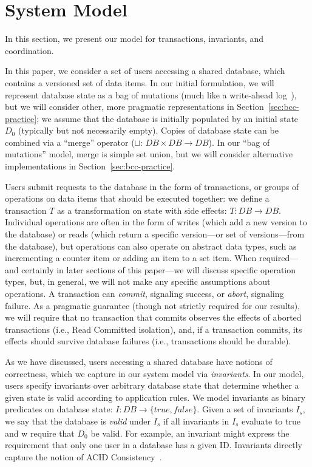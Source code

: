 
\section{System Model}
\label{sec:model}

In this section, we present our model for transactions, invariants,
and coordination.

 In this paper, we consider a set
of users accessing a shared database, which contains a versioned set
of data items. In our initial formulation, we will represent database
state as a bag of mutations (much like a write-ahead
log~\cite{gray-book}), but we will consider other, more pragmatic
representations in Section~\ref{sec:bcc-practice}; we assume that the
database is initially populated by an initial state $D_0$ (typically
but not necessarily empty). Copies of database state can be combined
via a ``merge'' operator ($\sqcup$: $DB \times DB \rightarrow DB$). In
our ``bag of mutations'' model, merge is simple set union, but we will
consider alternative implementations in
Section~\ref{sec:bcc-practice}.

Users submit requests to the database in the form of transactions, or
groups of operations on data items that should be executed together:
we define a transaction $T$ as a transformation on state with side
effects: $T: DB \rightarrow DB$. Individual operations are often in
the form of writes (which add a new version to the database) or reads
(which return a specific version---or set of versions---from the
database), but operations can also operate on abstract data types,
such as incrementing a counter item or adding an item to a set
item. When required---and certainly in later sections of this
paper---we will discuss specific operation types, but, in general, we
will not make any specific assumptions about operations. A transaction
can \textit{commit}, signaling success, or \textit{abort}, signaling
failure. As a pragmatic guarantee (though not strictly required for
our results), we will require that no transaction that commits
observes the effects of aborted transactions (i.e., Read Committed
isolation), and, if a transaction commits, its effects should survive
database failures (i.e., transactions should be durable).

 As we have discussed, users accessing a shared
database have notions of correctness, which we capture in our system
model via \textit{invariants}. In our model, users specify invariants
over arbitrary database state that determine whether a given state is
valid according to application rules. We model invariants as binary
predicates on database state: $I: DB \rightarrow \{true,
false\}$. Given a set of invariants $I_s$, we say that the database is
\textit{valid} under $I_s$ if all invariants in $I_s$ evaluate to true
and w require that $D_0$ be valid. For example, an invariant might
express the requirement that only one user in a database has a given
ID. Invariants directly capture the notion of ACID
Consistency~\cite{bernstein-book,gray-virtues}.

